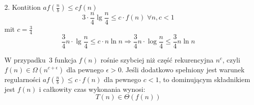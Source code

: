     2. Kontition $af(\frac{n}{b}) \leq cf(n)$
    \[
    3 \cdot \frac{n}{4} \lg \frac{n}{4} \leq c \cdot f(n)\; \forall n, c < 1
    \]
    mit $c = \frac{3}{4}$
    \[
    \frac{3}{4} n \cdot \lg \frac{n}{4} \leq c \cdot n \ln n \Rightarrow \frac{3}{4} n \cdot \log \frac{n}{4} \leq \frac{3}{4} n \ln n
    \]

    \begin{tcolorbox}[red = {Podsumowanie}]
    W przypadku~3 funkcja $f(n)$ rośnie szybciej niż część rekurencyjna $n^c$,  
    czyli $f(n) \in \Omega(n^{c + \epsilon})$ dla pewnego $\epsilon > 0$.  
    Jeśli dodatkowo spełniony jest warunek regularności 
    $a f\!\left(\frac{n}{b}\right) \leq c \cdot f(n)$ dla pewnego $c < 1$,  
    to dominującym składnikiem jest $f(n)$ i całkowity czas wykonania wynosi:
    \[
    T(n) \in \Theta(f(n))
    \]
    \end{tcolorbox}


